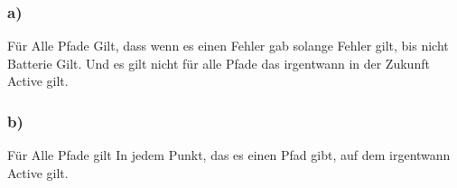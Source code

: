 \subsubsection*{a)}
Für Alle Pfade Gilt, dass wenn es einen Fehler gab solange Fehler gilt, bis nicht Batterie Gilt. Und es gilt nicht für alle Pfade das irgentwann in der Zukunft Active gilt.
\subsubsection*{b)}
Für Alle Pfade gilt In jedem Punkt, das es einen Pfad gibt, auf dem irgentwann Active gilt.